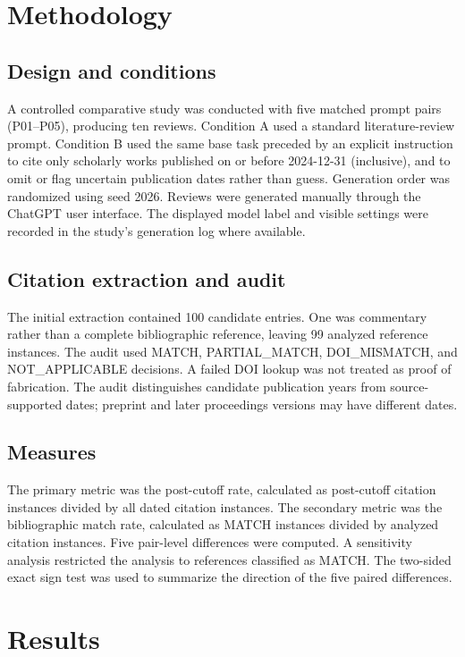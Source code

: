 \documentclass[11pt,a4paper]{article}
\begin{document}
\section{Methodology}
\subsection{Design and conditions}
A controlled comparative study was conducted with five matched prompt pairs (P01--P05), producing ten reviews. Condition A used a standard literature-review prompt. Condition B used the same base task preceded by an explicit instruction to cite only scholarly works published on or before 2024-12-31 (inclusive), and to omit or flag uncertain publication dates rather than guess. Generation order was randomized using seed 2026. Reviews were generated manually through the ChatGPT user interface. The displayed model label and visible settings were recorded in the study's generation log where available.

\subsection{Citation extraction and audit}
The initial extraction contained 100 candidate entries. One was commentary rather than a complete bibliographic reference, leaving 99 analyzed reference instances. The audit used MATCH, PARTIAL\_MATCH, DOI\_MISMATCH, and NOT\_APPLICABLE decisions. A failed DOI lookup was not treated as proof of fabrication. The audit distinguishes candidate publication years from source-supported dates; preprint and later proceedings versions may have different dates.

\subsection{Measures}
The primary metric was the post-cutoff rate, calculated as post-cutoff citation instances divided by all dated citation instances. The secondary metric was the bibliographic match rate, calculated as MATCH instances divided by analyzed citation instances. Five pair-level differences were computed. A sensitivity analysis restricted the analysis to references classified as MATCH. The two-sided exact sign test was used to summarize the direction of the five paired differences.

\section{Results}
\end{document}
